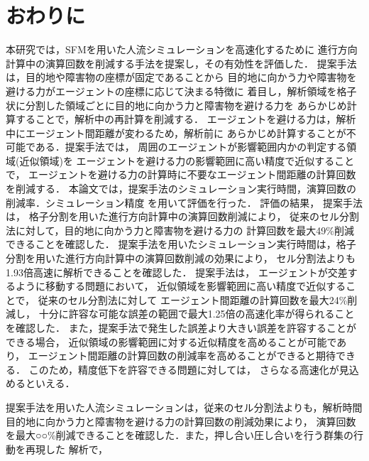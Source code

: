 \chapter{おわりに}
\label{sec:discuss}
本研究では，SFMを用いた人流シミュレーションを高速化するために
進行方向計算中の演算回数を削減する手法を提案し，その有効性を評価した．
提案手法は，目的地や障害物の座標が固定であることから
目的地に向かう力や障害物を避ける力がエージェントの座標に応じて決まる特徴に
着目し，解析領域を格子状に分割した領域ごとに目的地に向かう力と障害物を避ける力を
あらかじめ計算することで，解析中の再計算を削減する．
エージェントを避ける力は，解析中にエージェント間距離が変わるため，解析前に
あらかじめ計算することが不可能である．提案手法では，
周囲のエージェントが影響範囲内かの判定する領域(近似領域)を
エージェントを避ける力の影響範囲に高い精度で近似することで，
エージェントを避ける力の計算時に不要なエージェント間距離の計算回数を削減する．
本論文では，提案手法のシミュレーション実行時間，演算回数の削減率．シミュレーション精度
を用いて評価を行った．
評価の結果，
提案手法は，
格子分割を用いた進行方向計算中の演算回数削減により，
従来のセル分割法に対して，目的地に向かう力と障害物を避ける力の
計算回数を最大49\%削減できることを確認した．
提案手法を用いたシミュレーション実行時間は，格子分割を用いた進行方向計算中の演算回数削減の効果により，
セル分割法よりも1.93倍高速に解析できることを確認した．
提案手法は，
エージェントが交差するように移動する問題において，
近似領域を影響範囲に高い精度で近似することで，
従来のセル分割法に対して
エージェント間距離の計算回数を最大24\%削減し，
十分に許容な可能な誤差の範囲で最大1.25倍の高速化率が得られることを確認した．
また，提案手法で発生した誤差より大きい誤差を許容することができる場合，
近似領域の影響範囲に対する近似精度を高めることが可能であり，
エージェント間距離の計算回数の削減率を高めることができると期待できる．
このため，精度低下を許容できる問題に対しては，
さらなる高速化が見込めるといえる．



\clearpage
提案手法を用いた人流シミュレーションは，従来のセル分割法よりも，解析時間
目的地に向かう力と障害物を避ける力の計算回数の削減効果により，
演算回数を最大○○\%削減できることを確認した．また，押し合い圧し合いを行う群集の行動を再現した
解析で，


